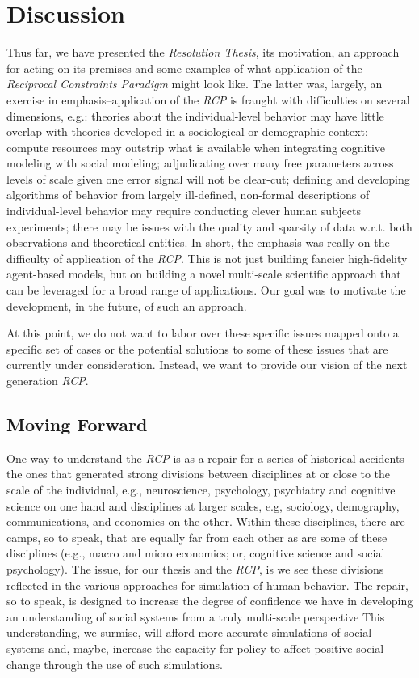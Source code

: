 \documentclass{article}
\begin{document}
\section{Discussion}
Thus far, we have presented the \textit{Resolution Thesis}, its motivation, an approach for acting on its premises and some examples of what application of the \textit{Reciprocal Constraints Paradigm} might look like.  The latter was, largely, an exercise in emphasis--application of the \textit{RCP} is fraught with difficulties on several dimensions, e.g.:  theories about the individual-level behavior may have little overlap with theories developed in a sociological or demographic context; compute resources may outstrip what is available when integrating cognitive modeling with social modeling; adjudicating over many free parameters across levels of scale given one error signal will not be clear-cut; defining and developing algorithms of behavior from largely ill-defined, non-formal descriptions of individual-level behavior may require conducting clever human subjects experiments; there may be issues with the quality and sparsity of data w.r.t. both observations and theoretical entities.  In short, the emphasis was really on the difficulty of application of the \textit{RCP}.  This is not just building fancier high-fidelity agent-based models, but on building a novel multi-scale scientific approach that can be leveraged for a broad range of applications.  Our goal was to motivate the development, in the future, of such an approach.
  
At this point, we do not want to labor over these specific issues mapped onto a specific set of cases or the potential solutions to some of these issues that are currently under consideration\cite{orr2018brims}.  Instead, we want to provide our vision of the next generation \textit{RCP}. 

\subsection{Moving Forward}
One way to understand the \textit{RCP} is as a repair for a series of historical accidents--the ones that generated strong divisions between disciplines at or close to the scale of the individual, e.g.,  neuroscience, psychology, psychiatry and cognitive science on one hand and disciplines at larger scales, e.g, sociology, demography, communications, and economics on the other.  Within these disciplines, there are camps, so to speak, that are equally far from each other as are some of these disciplines (e.g., macro and micro economics; or, cognitive science and social psychology).  The issue, for our thesis and the \textit{RCP}, is we see these divisions reflected in the various approaches for simulation of human behavior.  The repair, so to speak, is designed to increase the degree of confidence we have in developing an understanding of social systems from a truly multi-scale perspective  This understanding, we surmise, will afford more accurate simulations of social systems and, maybe, increase the capacity for policy to affect positive social change through the use of such simulations.
\end{document}
